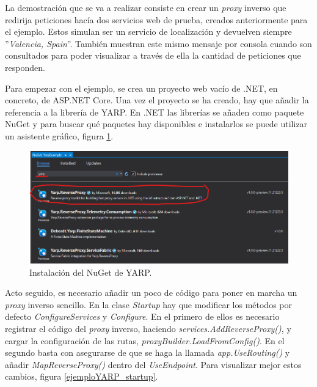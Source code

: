 \documentclass[11pt,spanish,listoffigures]{tfgetsinf}
\begin{document}
La demostración que se va a realizar consiste en crear un \emph{proxy} inverso que redirija peticiones hacía dos servicios web de prueba, creados anteriormente para el ejemplo. Estos simulan ser un servicio de localización y devuelven siempre ''\emph{Valencia, Spain}''. También muestran este mismo mensaje por consola cuando son consultados para poder visualizar a través de ella la cantidad de peticiones que responden.

Para empezar con el ejemplo, se crea un proyecto web vacío de .NET, en concreto, de ASP.NET Core. Una vez el proyecto se ha creado, hay que añadir la referencia a la librería de YARP. En .NET las librerías se añaden como paquete NuGet \cite{NuGet} y para buscar qué paquetes hay disponibles e instalarlos se puede utilizar un asistente gráfico, figura \ref{ejemploYARP_instalacionNuGet}.

\begin{figure}[ht]
\centering
\includegraphics[width=1\textwidth]{imagenes/ejemploYARP/instalacionNuGet}
\caption{Instalación del NuGet de YARP.}
	\label{ejemploYARP_instalacionNuGet}
\end{figure}

Acto seguido, es necesario añadir un poco de código para poner en marcha un \emph{proxy} inverso sencillo. En la clase \emph{Startup} hay que modificar los métodos por defecto \emph{ConfigureServices} y \emph{Configure}. En el primero de ellos es necesario registrar el código del \emph{proxy} inverso, haciendo \emph{services.AddReverseProxy()}, y cargar la configuración de las rutas, \emph{proxyBuilder.LoadFromConfig()}. En el segundo basta con asegurarse de que se haga la llamada \emph{app.UseRouting()} y añadir  \emph{MapReverseProxy()} dentro del \emph{UseEndpoint}. Para visualizar mejor estos cambios, figura \ref{ejemploYARP_startup}.
\end{document}
